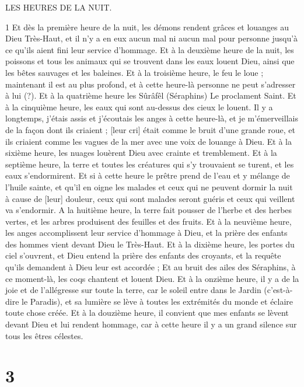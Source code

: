 \par LES HEURES DE LA NUIT.

\par 1 Et dès la première heure de la nuit, les démons rendent grâces et louanges au Dieu Très-Haut, et il n'y a en eux aucun mal ni aucun mal pour personne jusqu'à ce qu'ils aient fini leur service d'hommage. Et à la deuxième heure de la nuit, les poissons et tous les animaux qui se trouvent dans les eaux louent Dieu, ainsi que les bêtes sauvages et les baleines. Et à la troisième heure, le feu le loue ; maintenant il est au plus profond, et à cette heure-là personne ne peut s'adresser à lui (?). Et à la quatrième heure les Sûrâfêl (Séraphins) Le proclament Saint. Et à la cinquième heure, les eaux qui sont au-dessus des cieux le louent. Il y a longtemps, j'étais assis et j'écoutais les anges à cette heure-là, et je m'émerveillais de la façon dont ils criaient ; [leur cri] était comme le bruit d'une grande roue, et ils criaient comme les vagues de la mer avec une voix de louange à Dieu. Et à la sixième heure, les nuages ​​louèrent Dieu avec crainte et tremblement. Et à la septième heure, la terre et toutes les créatures qui s'y trouvaient se turent, et les eaux s'endormirent. Et si à cette heure le prêtre prend de l'eau et y mélange de l'huile sainte, et qu'il en oigne les malades et ceux qui ne peuvent dormir la nuit à cause de [leur] douleur, ceux qui sont malades seront guéris et ceux qui veillent va s'endormir. A la huitième heure, la terre fait pousser de l'herbe et des herbes vertes, et les arbres produisent des feuilles et des fruits. Et à la neuvième heure, les anges accomplissent leur service d'hommage à Dieu, et la prière des enfants des hommes vient devant Dieu le Très-Haut. Et à la dixième heure, les portes du ciel s'ouvrent, et Dieu entend la prière des enfants des croyants, et la requête qu'ils demandent à Dieu leur est accordée ; Et au bruit des ailes des Séraphins, à ce moment-là, les coqs chantent et louent Dieu. Et à la onzième heure, il y a de la joie et de l'allégresse sur toute la terre, car le soleil entre dans le Jardin (c'est-à-dire le Paradis), et sa lumière se lève à toutes les extrémités du monde et éclaire toute chose créée. Et à la douzième heure, il convient que mes enfants se lèvent devant Dieu et lui rendent hommage, car à cette heure il y a un grand silence sur tous les êtres célestes.

\chapter{3}


